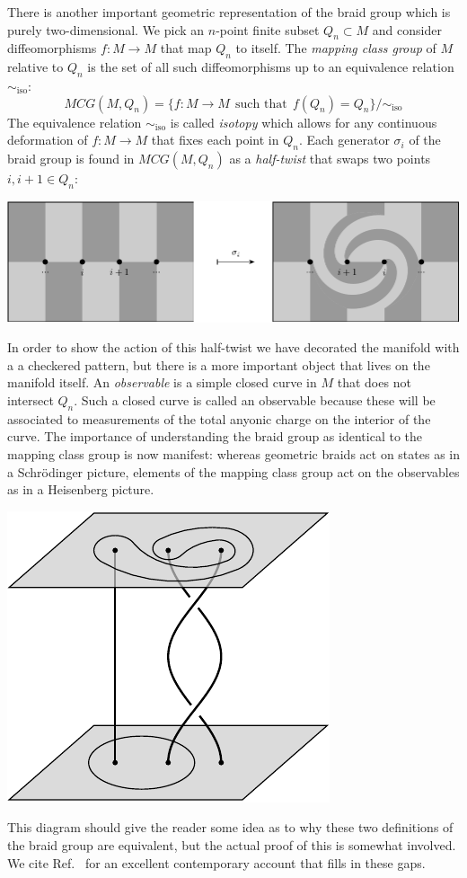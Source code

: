 There is another important geometric representation of
the braid group which is purely two-dimensional.
We pick an $n$-point finite subset $Q_n \subset M$
and consider diffeomorphisms 
$f : M \to M$
that map $Q_n$ to itself.
The \emph{mapping class group} of $M$ relative to $Q_n$
is the set of all such diffeomorphisms up to an equivalence relation $\sim_{\mbox{iso}}$:
$$
    MCG(M, Q_n) = \{ f : M \to M \ \ \mbox{such that}\ \ f(Q_n)=Q_n \} / \sim_{\mbox{iso}}
$$
The equivalence relation $\sim_{\mbox{iso}}$ is called \emph{isotopy}
which allows for any continuous deformation of $f:M\to M$ that
fixes each point in $Q_n.$
Each generator $\sigma_i$ of the braid group is found in $MCG(M, Q_n)$
as a \emph{half-twist} that swaps two points $i, i+1 \in Q_n$:
\begin{center}
\includegraphics[width=1.0\columnwidth]{pic-halftwist.pdf}
\end{center}
In order to show
the action of
this half-twist we have 
decorated the manifold with
a a checkered pattern,
but there is a more important
object that lives on the manifold
itself.
An \emph{observable} is a simple
closed curve in $M$ that does
not intersect $Q_n.$
Such a closed curve is called an
observable because these will be
associated to measurements
of the total anyonic charge on the
interior of the curve.
The importance of understanding the
braid group as identical to the mapping class group
is now manifest:
whereas geometric braids act on states
as in a Schr\"{o}dinger picture,
elements of the mapping class group
act on the observables as in
a Heisenberg picture.
\begin{center}
\includegraphics[]{pic-heisenberg.pdf}
\end{center}
This diagram should give the reader some idea as
to why these two definitions of the braid group are
equivalent, but the actual proof of this is somewhat involved.
We cite Ref.~\cite{Kassel2010} for an excellent contemporary
account that fills in these gaps.

